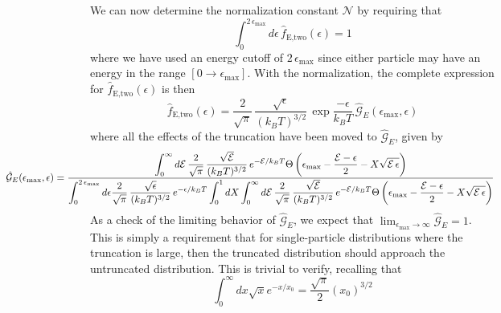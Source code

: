 We can now determine the normalization constant $\mathcal{N}$ by requiring that
\begin{equation*}
	\int_0^{2 \, \epsilon_\text{max}} d \epsilon \, \hat{f}_\text{E,two}(\epsilon) = 1
\end{equation*}
where we have used an energy cutoff of $2 \, \epsilon_\text{max}$ since either particle may have an energy in the range $[0 \rightarrow \epsilon_\text{max}]$. 
With the normalization, the complete expression for $\hat{f}_\text{E,two}(\epsilon)$ is then
\begin{equation} \label{eq:truncRelDist}
	\hat{f}_\text{E,two}(\epsilon) = \frac{2}{\sqrt{\pi}} \, \frac{\sqrt{\epsilon}}{(k_B T)^{3/2}} \, \exp{\frac{-\epsilon}{k_B T}} \, \hat{\mathcal{G}}_E(\epsilon_\text{max}, \epsilon)
\end{equation}
where all the effects of the truncation have been moved to $\hat{\mathcal{G}}_E$, given by 
\begin{equation} \label{eq:truncWeighting}
\hspace*{-3cm} 
	\hat{\mathcal{G}}_E(\epsilon_\text{max}, \epsilon) = \frac{\displaystyle
	\int_0^\infty d \mathcal{E} \, \frac{2}{\sqrt{\pi}} \, \frac{\sqrt{\mathcal{E}}}{(k_B T)^{3/2}} \, e^{-\mathcal{E} / k_B T} \heaviside{\epsilon_\text{max} - \frac{\mathcal{E} - \epsilon}{2} - X \sqrt{\mathcal{E} \,  \epsilon}}}
	{\displaystyle \int_0^{2\,\epsilon_\text{max}} d \epsilon \frac{2}{\sqrt{\pi}} \, \frac{\sqrt{\epsilon}}{(k_B T)^{3/2}} \, e^{-\epsilon/k_B T} \int_0^1 dX \int_0^\infty d \mathcal{E} \, \frac{2}{\sqrt{\pi}} \, \frac{\sqrt{\mathcal{E}}}{(k_B T)^{3/2}} \, e^{-\mathcal{E} / k_B T} \heaviside{\epsilon_\text{max} - \frac{\mathcal{E} - \epsilon}{2} - X \sqrt{\mathcal{E} \,  \epsilon}}}
\end{equation}
As a check of the limiting behavior of $\hat{\mathcal{G}}_E$, we expect that $ \displaystyle \lim_{\epsilon_\text{max} \rightarrow \infty} \hat{\mathcal{G}}_E = 1$.
This is simply a requirement that for single-particle distributions where the truncation is large, then the truncated distribution should approach the untruncated distribution. 
This is trivial to verify, recalling that 
\begin{equation}
	\int_0^{\infty} dx \sqrt{x} e^{-x/x_0} = \frac{\sqrt{\pi}}{2} (x_0)^{3/2}
\end{equation}

